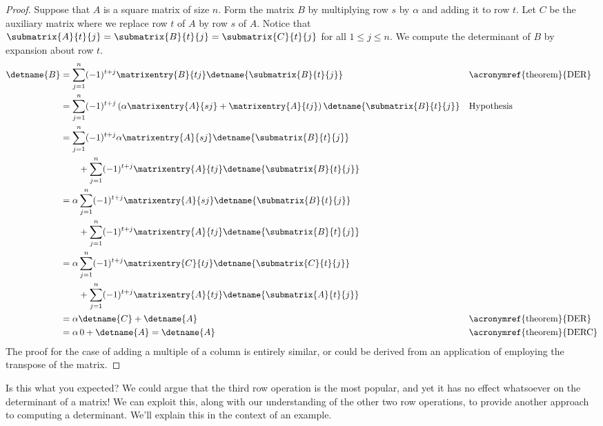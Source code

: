 \begin{proof}
Suppose that $A$ is a square matrix of size $n$.  Form the matrix $B$ by multiplying row $s$ by $\alpha$ and adding it to row $t$.  Let $C$ be the auxiliary matrix where we replace row $t$ of $A$ by row $s$ of $A$.  Notice that $\submatrix{A}{t}{j}=\submatrix{B}{t}{j}=\submatrix{C}{t}{j}$ for all $1\leq j\leq n$.  We compute the determinant of $B$ by expansion about row $t$.
%
\begin{align*}
\detname{B}
&=
\sum_{j=1}^{n}(-1)^{t+j}\matrixentry{B}{tj}\detname{\submatrix{B}{t}{j}}
&&\text{\acronymref{theorem}{DER}}\\
%
&=
\sum_{j=1}^{n}(-1)^{t+j}\left(\alpha\matrixentry{A}{sj}+\matrixentry{A}{tj}\right)\detname{\submatrix{B}{t}{j}}
&&\text{Hypothesis}\\
%
&=
\sum_{j=1}^{n}(-1)^{t+j}\alpha\matrixentry{A}{sj}\detname{\submatrix{B}{t}{j}}\\
&\quad\quad+
\sum_{j=1}^{n}(-1)^{t+j}\matrixentry{A}{tj}\detname{\submatrix{B}{t}{j}}\\
%
&=
\alpha\sum_{j=1}^{n}(-1)^{t+j}\matrixentry{A}{sj}\detname{\submatrix{B}{t}{j}}\\
&\quad\quad+
\sum_{j=1}^{n}(-1)^{t+j}\matrixentry{A}{tj}\detname{\submatrix{B}{t}{j}}\\
%
&=
\alpha\sum_{j=1}^{n}(-1)^{t+j}\matrixentry{C}{tj}\detname{\submatrix{C}{t}{j}}\\
&\quad\quad+
\sum_{j=1}^{n}(-1)^{t+j}\matrixentry{A}{tj}\detname{\submatrix{A}{t}{j}}\\
%
&=
\alpha\detname{C}+\detname{A}&&\text{\acronymref{theorem}{DER}}\\
%
&=
\alpha\,0+\detname{A} = \detname{A}&&\text{\acronymref{theorem}{DERC}}
%
\end{align*}
%
The proof for the case of adding a multiple of a column is entirely similar, or could be derived from an application of  employing the transpose of the matrix.
%
\end{proof}
%
Is this what you expected?  We could argue that the third row operation is the most popular, and yet it has no effect whatsoever on the determinant of a matrix!  We can exploit this, along with our understanding of the other two row operations, to provide another approach to computing a determinant.  We'll explain this in the context of an example.\par
%
